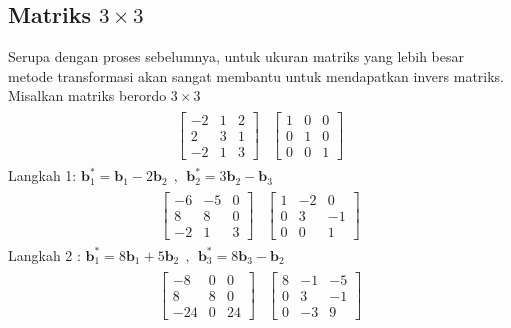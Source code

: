 \documentclass{article}   %
\begin{document}
\subsection{Matriks $3\times 3$}
Serupa dengan proses sebelumnya, untuk ukuran matriks yang lebih besar metode transformasi akan sangat membantu untuk mendapatkan invers matriks. Misalkan matriks berordo $3\times3$
\begin{align*}
	\begin{array}{r|r} 
		\left[
	\begin{array}{rrr} 
		-2 & 1 & 2\\
		2 & 3 & 1\\
		-2 &1 & 3 
	\end{array} 
	\right]  & \left[
	\begin{array}{rrr} 
		1 & 0 & 0\\
		0 & 1 & 0\\
		0 &0 & 1 
	\end{array} 
	\right]
	\end{array}
\end{align*}
Langkah 1: $\textbf{b}^*_1= \textbf{b}_1 - 2\textbf{b}_2~~,~~\textbf{b}^*_2= 3\textbf{b}_2 - \textbf{b}_3$ \\
\begin{align*}
	\begin{array}{r|r} 
		\left[
		\begin{array}{rrr} 
			-6 & -5 & 0\\
			8 & 8 & 0\\
			-2 &1 & 3 
		\end{array} 
		\right]  & \left[
		\begin{array}{rrr} 
			1 & -2 & 0\\
			0 & 3 & -1\\
			0 &0 & 1 
		\end{array} 
		\right]
	\end{array}
\end{align*}
Langkah 2 : $\textbf{b}^*_1= 8\textbf{b}_1 + 5\textbf{b}_2~~,~~\textbf{b}^*_3= 8\textbf{b}_3 - \textbf{b}_2$ \\
\begin{align*}
	\begin{array}{r|r} 
		\left[
		\begin{array}{rrr} 
			-8 & 0 & 0\\
			8 & 8 & 0\\
			-24 &0 & 24 
		\end{array} 
		\right]  & \left[
		\begin{array}{rrr} 
			8 & -1 & -5\\
			0 & 3 & -1\\
			0 &-3 & 9 
		\end{array} 
		\right]
	\end{array}
\end{align*}
\end{document}
